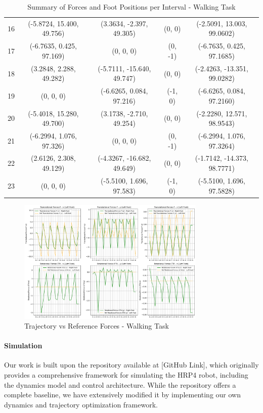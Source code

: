 \documentclass[main.tex]{subfiles}
\begin{document}
\begin{table}[H]
{\begin{tabular}{c|c|c|c|c}
            16 & (-5.8724, 15.400, 49.756) & (3.3634, -2.397, 49.305) & (0, 0) & (-2.5091, 13.003, 99.0602) \\
            17 & (-6.7635, 0.425, 97.169) & (0, 0, 0) & (0, -1) & (-6.7635, 0.425, 97.1685) \\
            18 & (3.2848, 2.288, 49.282) & (-5.7111, -15.640, 49.747) & (0, 0) & (-2.4263, -13.351, 99.0282) \\
            19 & (0, 0, 0) & (-6.6265, 0.084, 97.216) & (-1, 0) & (-6.6265, 0.084, 97.2160) \\
            20 & (-5.4018, 15.280, 49.700) & (3.1738, -2.710, 49.254) & (0, 0) & (-2.2280, 12.571, 98.9543) \\
            21 & (-6.2994, 1.076, 97.326) & (0, 0, 0) & (0, -1) & (-6.2994, 1.076, 97.3264) \\
            22 & (2.6126, 2.308, 49.129) & (-4.3267, -16.682, 49.649) & (0, 0) & (-1.7142, -14.373, 98.7771) \\
            23 & (0, 0, 0) & (-5.5100, 1.696, 97.583) & (-1, 0) & (-5.5100, 1.696, 97.5828) \\
            \hline
        \end{tabular}
    }
    \caption{Summary of Forces and Foot Positions per Interval - Walking Task}
    \label{tab:data_table}
\end{table}
\begin{figure}[htbp]
    \centering
    \includegraphics[width=0.8\textwidth]{figures/contact_forces_walking.png}
    \caption{Trajectory vs Reference Forces - Walking Task}
    \label{fig:contact_forces_walking}
\end{figure}


\paragraph{Simulation} 
Our work is built upon the repository available at [GitHub Link], which originally provides a comprehensive framework for simulating the HRP4 robot, including the dynamics model and control architecture. While the repository offers a complete baseline, we have extensively modified it by implementing our own dynamics and trajectory optimization framework. \\
\end{document}
